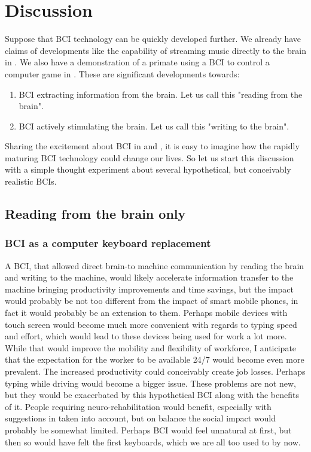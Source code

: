 \documentclass[fleqn,11pt]{olplainarticle}
\begin{document}
\section{Discussion}
Suppose that BCI technology can be quickly developed further. We already have claims of developments like the capability of streaming music directly to the brain in \cite{pero_2020}. We also have a demonstration of a primate using a BCI to control a computer game in \cite{wakefield_2020}. These are significant developments towards:
\begin{enumerate}
    \item BCI extracting information from the brain. Let us call this "reading from the brain".
    \item BCI actively stimulating the brain. Let us call this "writing to the brain".
\end{enumerate}

Sharing the excitement about BCI in \cite{warwick2003cyborg} and \cite{schalk2008brain}, it is easy to imagine how the rapidly maturing BCI technology could change our lives. So let us start this discussion with a simple thought experiment about several hypothetical, but conceivably realistic BCIs.

\subsection{Reading from the brain only}
\subsubsection{BCI as a computer keyboard replacement}
A BCI, that allowed direct brain-to machine communication by reading the brain and writing to the machine, would likely accelerate information transfer to the machine \cite{schalk2008brain} bringing productivity improvements and time savings, but the impact would probably be not too different from the impact of smart mobile phones, in fact it would probably be an extension to them. Perhaps mobile devices with touch screen would become much more convenient with regards to typing speed and effort, which would lead to these devices being used for work a lot more. While that would improve the mobility and flexibility of workforce, I anticipate that the expectation for the worker to be available 24/7 would become even more prevalent. The increased productivity could conceivably create job losses. Perhaps typing while driving would become a bigger issue. These problems are not new, but they would be exacerbated by this hypothetical BCI along with the benefits of it. People requiring neuro-rehabilitation would benefit, especially with suggestions in \cite{liberati2015developing} taken into account, but on balance the social impact would probably be somewhat limited. Perhaps BCI would feel unnatural at first, but then so would have felt the first keyboards, which we are all too used to by now.
\end{document}
